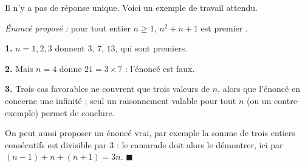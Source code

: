 Il n'y a pas de réponse unique. Voici un exemple de travail attendu.

\emph{Énoncé proposé :} \og pour tout entier $n \geqslant 1$, $n^2 + n + 1$
est premier \fg.

\textbf{1.} $n = 1, 2, 3$ donnent $3$, $7$, $13$, qui sont premiers.

\textbf{2.} Mais $n = 4$ donne $21 = 3 \times 7$ : l'énoncé est faux.

\textbf{3.} Trois cas favorables ne couvrent que trois valeurs de $n$, alors
que l'énoncé en concerne une infinité ; seul un raisonnement valable pour
tout $n$ (ou un contre-exemple) permet de conclure.

On peut aussi proposer un énoncé vrai, par exemple \og la somme de trois
entiers consécutifs est divisible par $3$ \fg : le camarade doit alors le
démontrer, ici par $(n-1) + n + (n+1) = 3n$. \hfill $\blacksquare$
